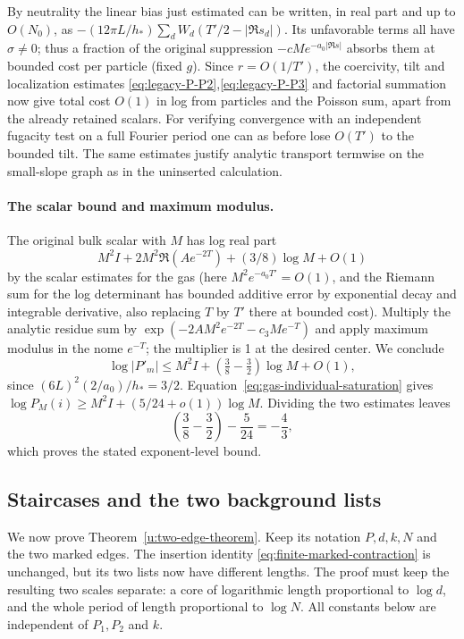By neutrality the linear bias just estimated can be written, in real part and up to \(O(N_0)\), as
\(- (12\pi L/h_*)\sum_d W_d(T'/2-|\Re s_d|)\). Its unfavorable terms all have \(\sigma\ne0\); thus a fraction of the original suppression \(-c M e^{-a_0 |\Re s|}\) absorbs them at bounded cost per particle (fixed \(g\)). Since \(r=O(1/T')\), the coercivity, tilt and localization estimates \eqref{eq:legacy-P-P2},\eqref{eq:legacy-P-P3} and factorial summation now give total cost \(O(1)\) in log from particles and the Poisson sum, apart from the already retained scalars. For verifying convergence with an independent fugacity test on a full Fourier period one can as before lose \(O(T')\) to the bounded tilt. The same estimates justify analytic transport termwise on the small-slope graph as in the uninserted calculation.

\paragraph{The scalar bound and maximum modulus.}
The original bulk scalar with \(M\) has log real part
\[
 M^2 I+2 M^2\Re(A e^{-2T})+(3/8)\log M+O(1)
\]
by the scalar estimates for the gas (here \(M^2 e^{-a_0T'}=O(1)\), and the Riemann sum for the log determinant has bounded additive error by exponential decay and integrable derivative, also replacing \(T\) by \(T'\) there at bounded cost). Multiply the analytic residue sum by \(\exp(-2 A M^2 e^{-2T}-c_3 M e^{-T})\) and apply maximum modulus in the nome \(e^{-T}\); the multiplier is 1 at the desired center. We conclude
\[
 \log|P'_m|\le M^2 I+\left(\tfrac38-\tfrac32\right)\log M+O(1),
\]
since \((6L)^2(2/a_0)/h_*=3/2\). Equation~\eqref{eq:gas-individual-saturation} gives
\(\log P_M(i)\ge M^2I+(5/24+o(1))\log M\). Dividing the two estimates leaves
\[
 \left(\frac38-\frac32\right)-\frac5{24}=-\frac43,
\]
which proves the stated exponent-level bound.

\subsection{Staircases and the two background lists}\label{c6:unequal-marks}



We now prove Theorem~\ref{u:two-edge-theorem}.  Keep its notation $P,d,k,N$ and the two marked edges.  The insertion identity \eqref{eq:finite-marked-contraction} is unchanged, but its two lists now have different lengths.  The proof must keep the resulting two scales separate: a core of logarithmic length proportional to $\log d$, and the whole period of length proportional to $\log N$.  All constants below are independent of $P_1,P_2$ and $k$.



